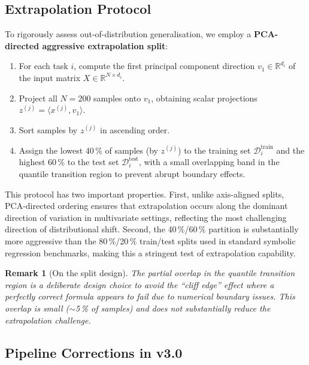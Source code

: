 \documentclass[twoside,11pt]{article}
\newtheorem{remark}[theorem]{Remark}
\begin{document}
\subsection{Extrapolation Protocol}
\label{sec:split}

To rigorously assess out-of-distribution generalisation, we employ a
\textbf{PCA-directed aggressive extrapolation split}:

\begin{enumerate}[leftmargin=2em,label=\arabic*.]
  \item For each task $i$, compute the first principal component direction
    $v_1 \in \mathbb{R}^{d_i}$ of the input matrix $X \in \mathbb{R}^{N \times d_i}$.
  \item Project all $N=200$ samples onto $v_1$, obtaining scalar projections
    $z^{(j)} = \langle x^{(j)}, v_1 \rangle$.
  \item Sort samples by $z^{(j)}$ in ascending order.
  \item Assign the lowest 40\,\% of samples (by $z^{(j)}$) to the training set
    $\mathcal{D}^{\mathrm{train}}_i$ and the highest 60\,\% to the test set
    $\mathcal{D}^{\mathrm{test}}_i$, with a small overlapping band in the
    quantile transition region to prevent abrupt boundary effects.
\end{enumerate}

This protocol has two important properties.  First, unlike axis-aligned splits,
PCA-directed ordering ensures that extrapolation occurs along the dominant
direction of variation in multivariate settings, reflecting the most
challenging direction of distributional shift.  Second, the 40\,\%/60\,\%
partition is substantially more aggressive than the 80\,\%/20\,\% train/test
splits used in standard symbolic regression benchmarks, making this a stringent
test of extrapolation capability.

\begin{remark}[On the split design]
The partial overlap in the quantile transition region is a deliberate design choice
to avoid the ``cliff edge'' effect where a perfectly correct formula appears to
fail due to numerical boundary issues.  This overlap is small ($\sim$5\,\% of
samples) and does not substantially reduce the extrapolation challenge.
\end{remark}

\subsection{Pipeline Corrections in v3.0}
\label{sec:corrections}
\end{document}
